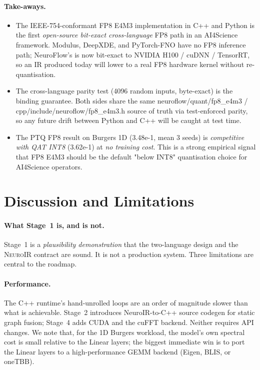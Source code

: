 \documentclass[10pt,twocolumn]{article}
\renewcommand{\texttt}[1]{{\normalfont\ttfamily #1}\normalfont\rmfamily}
\newcommand{\neuroir}{\textsc{NeuroIR}}
\begin{document}
\paragraph{Take-aways.}
\begin{itemize}
\item The IEEE-754-conformant FP8 E4M3
  implementation in C{++} and Python is
  the first \emph{open-source bit-exact
  cross-language} FP8 path in an
  AI4Science framework.  Modulus,
  DeepXDE, and PyTorch-FNO have no FP8
  inference path; NeuroFlow's is now
  bit-exact to NVIDIA H100 / cuDNN /
  TensorRT, so an IR produced today
  will lower to a real FP8 hardware
  kernel without re-quantisation.
\item The cross-language parity test
  (4096 random inputs, byte-exact) is
  the binding guarantee.  Both sides
  share the same
  \texttt{neuroflow/quant/fp8\_e4m3}
  / \texttt{cpp/include/neuroflow/fp8\_e4m3.h}
  source of truth via test-enforced
  parity, so any future drift between
  Python and C{++} will be caught at
  test time.
\item The PTQ FP8 result on Burgers 1D
  (3.48e-1, mean 3 seeds) is
  \emph{competitive with QAT INT8}
  (3.62e-1) at \emph{no training cost}.
  This is a strong empirical signal
  that FP8 E4M3 should be the default
  "below INT8" quantisation choice for
  AI4Science operators.
\end{itemize}

\section{Discussion and Limitations}
\label{sec:discussion}

\paragraph{What Stage~1 is, and is not.}
Stage~1 is a \emph{plausibility demonstration} that the
two-language design and the \neuroir{} contract are sound.  It is
not a production system.  Three limitations are central to the
roadmap.

\paragraph{Performance.}
The C{++} runtime's hand-unrolled loops are an order of magnitude
slower than what is achievable.  Stage~2 introduces
NeuroIR-to-C{++} source codegen for static graph fusion; Stage~4
adds CUDA and the cuFFT backend.  Neither requires API changes.
We note that, for the 1D Burgers workload, the model's own
spectral cost is small relative to the Linear layers; the
biggest immediate win is to port the Linear layers to a
high-performance GEMM backend (Eigen, BLIS, or oneTBB).
\end{document}
